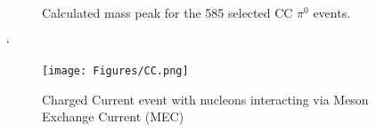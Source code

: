 \documentclass[12pt]{article}
\begin{document}
\begin{figure}[h!]
\centering
{}
\caption{Calculated mass peak for the 585 selected CC $\pi^0$ events. }
\label{fig:mass}
\end{figure}

`




\begin{figure}[H]
\centering
\texttt{[image: Figures/CC.png]}
\caption{Charged Current event with nucleons interacting via Meson Exchange Current (MEC)}
\label{fig:CCNC}
\end{figure}


\newpage
\end{document}
